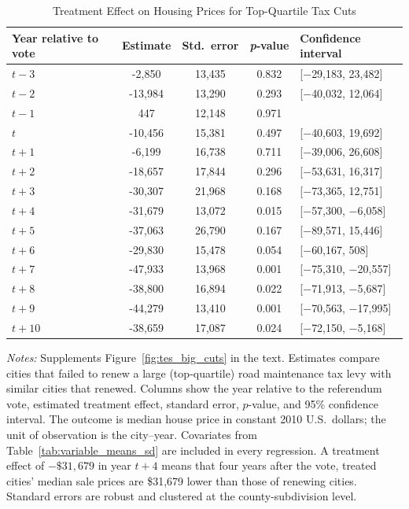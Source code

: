 \begin{table}[htbp]
    \centering
    \caption{Treatment Effect on Housing Prices for Top-Quartile Tax Cuts}
    \label{tab:median_sale_amount_topquartile}
    \begin{threeparttable}
    \begin{minipage}{\linewidth}
    \centering
    \begin{tabular}{p{4.5cm}cccl}
        \hline
        \textbf{Year relative to vote} & \textbf{Estimate} & \textbf{Std.~error} & \textbf{\textit{p}‐value} & \textbf{Confidence interval} \\
        \hline
        $t - 3$  &  -2,850  & 13,435 & 0.832 & [$-$29,183, 23,482] \\
        $t - 2$  & -13,984  & 13,290 & 0.293 & [$-$40,032, 12,064] \\
        $t - 1$  &     447  & 12,148 & 0.971 &  \\
        $t$      & -10,456  & 15,381 & 0.497 & [$-$40,603, 19,692] \\
        $t + 1$  &  -6,199  & 16,738 & 0.711 & [$-$39,006, 26,608] \\
        $t + 2$  & -18,657  & 17,844 & 0.296 & [$-$53,631, 16,317] \\
        $t + 3$  & -30,307  & 21,968 & 0.168 & [$-$73,365, 12,751] \\
        $t + 4$  & -31,679  & 13,072 & 0.015 & [$-$57,300,  $-$6,058] \\
        $t + 5$  & -37,063  & 26,790 & 0.167 & [$-$89,571, 15,446] \\
        $t + 6$  & -29,830  & 15,478 & 0.054 & [$-$60,167,     508] \\
        $t + 7$  & -47,933  & 13,968 & 0.001 & [$-$75,310, $-$20,557] \\
        $t + 8$  & -38,800  & 16,894 & 0.022 & [$-$71,913,  $-$5,687] \\
        $t + 9$  & -44,279  & 13,410 & 0.001 & [$-$70,563, $-$17,995] \\
        $t + 10$ & -38,659  & 17,087 & 0.024 & [$-$72,150,  $-$5,168] \\
        \hline
    \end{tabular}
    \vspace{0.5em}
    \begin{tablenotes}[flushleft]
        \small
        \item \textit{Notes:} Supplements Figure~\ref{fig:tes_big_cuts} in the text. Estimates compare cities that failed to renew a large (top‐quartile) road maintenance tax levy with similar cities that renewed. Columns show the year relative to the referendum vote, estimated treatment effect, standard error, \(p\)-value, and 95\% confidence interval. The outcome is median house price in constant 2010 U.S.\ dollars; the unit of observation is the city–year. Covariates from Table~\ref{tab:variable_means_sd} are included in every regression. A treatment effect of \(-\$31{,}679\) in year \(t+4\) means that four years after the vote, treated cities’ median sale prices are \$31,679 lower than those of renewing cities. Standard errors are robust and clustered at the county-subdivision level.

\end{tablenotes}
\end{minipage}
\end{threeparttable}
\end{table}
